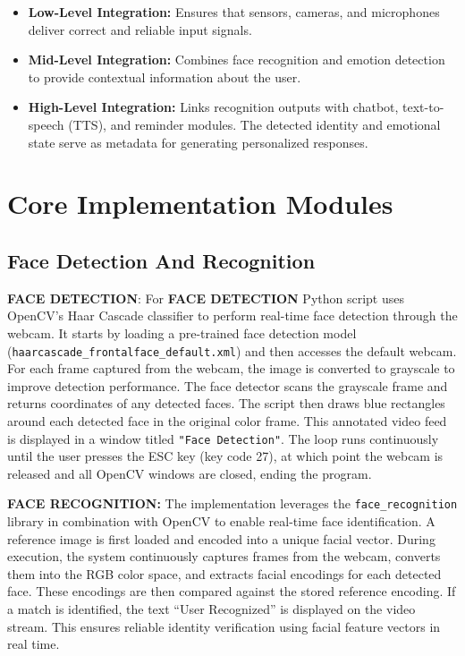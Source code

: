 \begin{itemize}
    \item \textbf{Low-Level Integration:}  
    Ensures that sensors, cameras, and microphones deliver correct and reliable input signals.  

    \item \textbf{Mid-Level Integration:}  
    Combines face recognition and emotion detection to provide contextual information 
    about the user.  

    \item \textbf{High-Level Integration:}  
    Links recognition outputs with chatbot, text-to-speech (TTS), and reminder modules. 
    The detected identity and emotional state serve as metadata for generating 
    personalized responses.  
\end{itemize}

\section*{Core Implementation Modules}
\subsection*{Face Detection And Recognition}


\textbf{FACE DETECTION}: For \textbf{FACE DETECTION} Python script uses OpenCV’s Haar Cascade classifier to perform real-time face detection through the webcam. It starts by loading a pre-trained face detection model (\texttt{haarcascade\_frontalface\_default.xml}) and then accesses the default webcam. For each frame captured from the webcam, the image is converted to grayscale to improve detection performance. The face detector scans the grayscale frame and returns coordinates of any detected faces. The script then draws blue rectangles around each detected face in the original color frame. This annotated video feed is displayed in a window titled \texttt{"Face Detection"}. The loop runs continuously until the user presses the ESC key (key code 27), at which point the webcam is released and all OpenCV windows are closed, ending the program.

\textbf{FACE RECOGNITION:}  
The implementation leverages the \texttt{face\_recognition} library in combination with OpenCV to enable real-time face identification. A reference image is first loaded and encoded into a unique facial vector. During execution, the system continuously captures frames from the webcam, converts them into the RGB color space, and extracts facial encodings for each detected face. These encodings are then compared against the stored reference encoding. If a match is identified, the text ``User Recognized'' is displayed on the video stream. This ensures reliable identity verification using facial feature vectors in real time.

